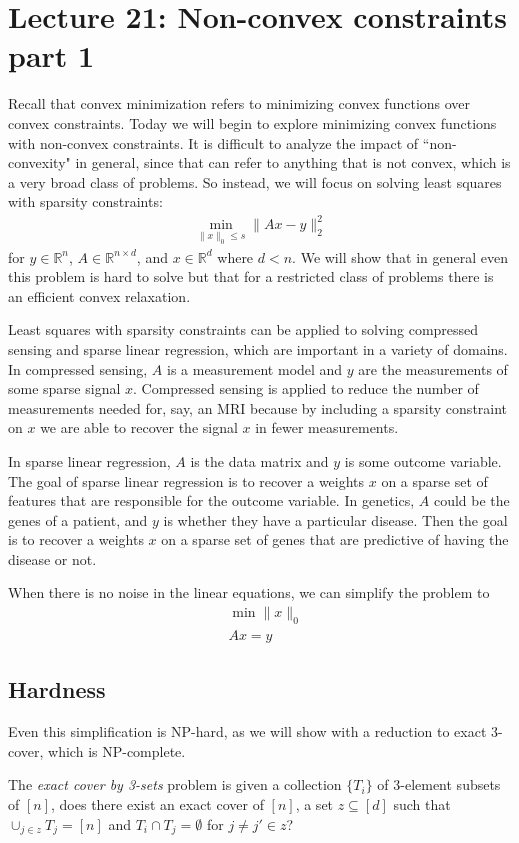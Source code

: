 \section{Lecture 21: Non-convex constraints part 1}
Recall that convex minimization refers to minimizing convex functions over convex constraints. Today we will begin to explore minimizing convex functions with non-convex constraints. It is difficult to analyze the impact of ``non-convexity" in general, since that can refer to anything that is not convex, which is a very broad class of problems. So instead, we will focus on solving least squares with sparsity constraints:
\begin{align*}
    \min_{\|x\|_0 \leq s} \|Ax-y\|^2_2
\end{align*}
for $y \in \mathbb{R}^{n}$, $A \in \mathbb{R}^{n \times d}$, and $x \in \mathbb{R}^{d}$ where $d < n$. We will show that in general even this problem is hard to solve but that for a restricted class of problems there is an efficient convex relaxation.

Least squares with sparsity constraints can be applied to solving compressed sensing and sparse linear regression, which are important in a variety of domains. In compressed sensing, $A$ is a measurement model and $y$ are the measurements of some sparse signal $x$. Compressed sensing is applied to reduce the number of measurements needed for, say, an MRI because by including a sparsity constraint on $x$ we are able to recover the signal $x$ in fewer measurements.

In sparse linear regression, $A$ is the data matrix and $y$ is some outcome variable. The goal of sparse linear regression is to recover a weights $x$ on a sparse set of features that are responsible for the outcome variable. In genetics, $A$ could be the genes of a patient, and $y$ is whether they have a particular disease. Then the goal is to recover a weights $x$ on a sparse set of genes that are predictive of having the disease or not.

When there is no noise in the linear equations, we can simplify the problem to
\begin{align*}
    & \min \|x\|_0 \\
    &  Ax = y
\end{align*}

\subsection{Hardness}
Even this simplification is NP-hard, as we will show with a reduction to exact 3-cover, which is NP-complete.
\begin{definition}
The \textit{exact cover by 3-sets} problem is given a collection $\{T_i\}$ of 3-element subsets of $[n]$, does there exist an exact cover of $[n]$, a set $z \subseteq [d]$ such that $\cup_{j \in z} T_j = [n]$ and $T_i \cap T_j = \emptyset$ for $j \neq j' \in z$?
\end{definition}

